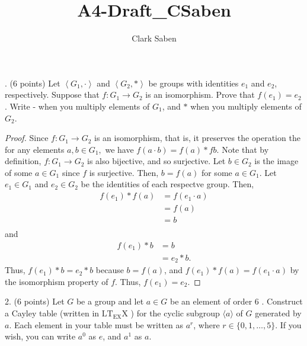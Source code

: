 \documentclass[12pt]{article}
\begin{document}
 
 
\title{A4-Draft\_CSaben}
\author{Clark Saben}

 
. (6 points) Let $\left\langle G_{1}, \cdot\right\rangle$ and 
	$\left\langle G_{2}, *\right\rangle$ be groups with identities 
	$e_{1}$ and $e_{2}$, respectively. 
	Suppose that $f: G_{1} \rightarrow G_{2}$ is an isomorphism. 
	Prove that $f\left(e_{1}\right)=e_{2}$. Write - when you 
	multiply elements of $G_{1}$, and $*$ when you multiply elements of $G_{2}$.

\begin{proof}{1} 
	Since $f: G_{1} \rightarrow G_{2}$ is an isomorphism,
	that is, it preserves the operation the for any elements 
	$a,b \in G_1, $ we have $f(a \cdot b) = f(a)*f{b}$.
	Note that by definition, $f: G_{1} \rightarrow G_{2}$ is also bijective, and so surjective.
	Let $b \in G_2$ is the image of some $a \in G_1$ since 
	$f$ is surjective. Then, $b = f(a)$ for some $a \in G_1$.
	Let $e_1 \in G_1$ and $e_2 \in G_2$ be the identities
	of each respectve group. Then,
	$$
	\begin{aligned}
		f(e_1)*f(a) &= f(e_1 \cdot a) \\
			    &= f(a) \\
			    &= b \\
	\end{aligned}
	$$
	and
	$$
	\begin{aligned}
		f(e_1)*b &= b \\
			 &= e_2 * b. 
	\end{aligned}
	$$
	Thus, $f(e_1)*b = e_2 * b$ because $b = f(a)$, and $f(e_1)*f(a) = f(e_1 \cdot a)$
	by the isomorphism property of $f$. Thus, $f(e_1) = e_2$.

\end{proof}

2. (6 points) Let $G$ be a group and let $a \in G$ be an element of order 6 . Construct a Cayley table (written in $\mathrm{LT}_{\mathrm{EX}} \mathrm{X}$ ) for the cyclic subgroup $\langle a\rangle$ of $G$ generated by $a$. Each element in your table must be written as $a^{r}$, where $r \in\{0,1, \ldots, 5\}$. If you wish, you can write $a^{0}$ as $e$, and $a^{1}$ as $a$.
\end{document}
